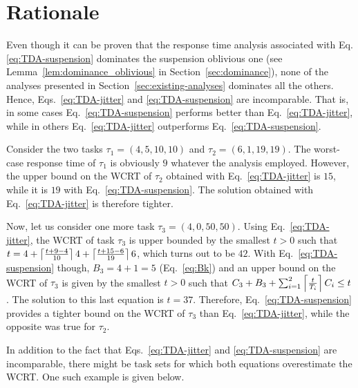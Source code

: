 \section{Rationale}
\label{sec:rationale}

Even though it can be proven that the response time analysis associated with Eq.\eqref{eq:TDA-suspension} dominates the suspension oblivious one (see Lemma~\ref{lem:dominance_oblivious} in Section~\ref{sec:dominance}), none of the analyses presented in Section~\ref{sec:existing-analyses} dominates all the others. Hence, Eqs.~\eqref{eq:TDA-jitter} and \eqref{eq:TDA-suspension} are incomparable. That is, in some cases Eq.~\eqref{eq:TDA-suspension} performs better than Eq.~\eqref{eq:TDA-jitter}, while in others Eq.~\eqref{eq:TDA-jitter} outperforms Eq.~\eqref{eq:TDA-suspension}.

\begin{example} 
\label{ex:rationale_1}  
Consider the two tasks $\tau_1 = (4, 5, 10, 10)$ and $\tau_2 =(6, 1, 19, 19)$. The worst-case response time of $\tau_1$ is obviously $9$ whatever the analysis employed. However, the upper bound on the WCRT of $\tau_2$ obtained with Eq.~\eqref{eq:TDA-jitter} is $15$, while it is $19$ with Eq.~\eqref{eq:TDA-suspension}. The solution obtained with Eq.~\eqref{eq:TDA-jitter} is therefore tighter.

Now, let us consider one more task $\tau_3 = (4, 0, 50, 50)$. Using Eq.~\eqref{eq:TDA-jitter}, the WCRT of task $\tau_3$ is upper bounded by the smallest $t>0$ such that
$t = 4 +\left\lceil{ \frac{t + 9 - 4}{10} }\right\rceil 4 +\left\lceil{ \frac{t + 15 - 6}{19} }\right\rceil 6$, which turns out to be $42$. With Eq.~\eqref{eq:TDA-suspension} though, $B_3 = 4+1 = 5$ (Eq.~\eqref{eq:Bk}) and an upper bound on the WCRT of $\tau_3$ is given by the smallest $t>0$ such that 
$C_3 + B_3 + \sum_{i=1}^{2}\left\lceil{\frac{t}{T_i}}\right\rceil C_i \leq t$. The solution to this last equation is $t=37$. Therefore, Eq.~\eqref{eq:TDA-suspension} provides a tighter bound on the WCRT of $\tau_3$ than Eq.~\eqref{eq:TDA-jitter}, while the opposite was true for $\tau_2$.
\hfill\myendproof
\end{example}

In addition to the fact that Eqs.~\eqref{eq:TDA-jitter} and \eqref{eq:TDA-suspension} are incomparable, there might be task sets for which both equations overestimate the WCRT. One such example is given below.
 
